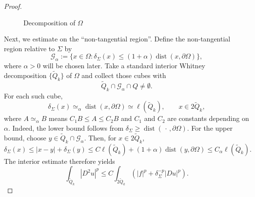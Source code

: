 \documentclass[12pt]{amsart}
\numberwithin{equation}{section}
\newcommand\dist{\operatorname{dist}}
\begin{document}
\begin{proof}
\begin{figure}
\caption{Decomposition of $\Omega$}
\label{Figure1}
\end{figure}

Next, we estimate on the ``non-tangential region''. Define the non-tangential region
relative to $\Sigma$ by
\[
 \mathcal G_\alpha
 :=\{x\in\Omega:\delta_\Sigma(x)
 \leq(1+\alpha)\dist(x,\partial\Omega)\},
\]
where $\alpha>0$ will be chosen later. Take a standard interior Whitney
decomposition $\{\widetilde Q_k\}$ of $\Omega$ and collect those cubes with
\[
 \widetilde Q_k\cap\mathcal G_\alpha\cap Q\neq\emptyset.
\]
For each such cube,
\begin{equation}\label{est-intcube}
 \delta_\Sigma(x)
 \simeq_\alpha \dist(x,\partial\Omega)
 \simeq \ell(\widetilde Q_k),
 \qquad x\in2\widetilde Q_k,
\end{equation}
where $ A \simeq_\alpha B$ means $C_1 B \leq A \leq C_2 B$ and $C_1$ and $C_2$ are constants depending on $\alpha$. Indeed, the lower bound follows from
$\delta_\Sigma\geq\dist(\,\cdot\,,\partial\Omega)$. For the upper bound,
choose $y\in\widetilde Q_k\cap\mathcal G_\alpha$. Then, for
$x\in2\widetilde Q_k$,
\[
 \delta_\Sigma(x)
 \leq |x-y|+\delta_\Sigma(y)
 \leq C\ell(\widetilde Q_k)
 +(1+\alpha)\dist(y,\partial\Omega)
 \leq C_\alpha\ell(\widetilde Q_k).
\]
The interior estimate therefore yields
\[
 \int_{\widetilde Q_k}|D^2u|^p
 \leq C\int_{2\widetilde Q_k}
 \left(|f|^p+\delta_\Sigma^{-p}|Du|^p\right).
\]


\end{proof}
\end{document}
